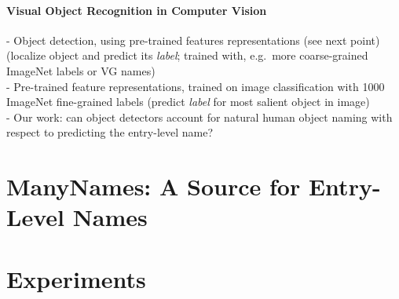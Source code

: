 \documentclass[11pt,a4paper]{article}
\newcommand{\cs}[1]{\textcolor{green!60!black}{\emph{//cs: #1//}}}
\begin{document}
\paragraph{Visual Object Recognition in Computer Vision}
- Object detection, using pre-trained features representations (see next point) (localize object and predict its \textit{label}; trained with, e.g.\ more coarse-grained ImageNet labels or VG names)\\
- Pre-trained feature representations, trained on image classification with 1000 ImageNet fine-grained labels (predict \textit{label} for most salient object in image)\\
- Our work: can object detectors account for natural human object naming with respect to predicting the entry-level name? 


\section{ManyNames: A Source for Entry-Level Names}
\label{sec:manynames}



\section{Experiments}
\label{sec:experiments}
%

\end{document}
